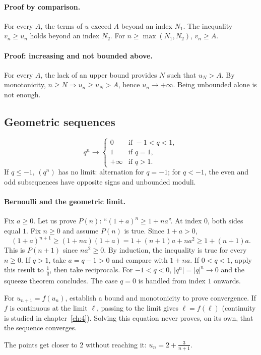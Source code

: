 \paragraph{Proof by comparison.} For every $A$, the terms of $u$ exceed $A$ beyond an index $N_1$. The inequality $v_n\ge u_n$ holds beyond an index $N_2$. For $n\ge\max(N_1,N_2)$, $v_n\ge A$.
\paragraph{Proof: increasing and not bounded above.} For every $A$, the lack of an upper bound provides $N$ such that $u_N>A$. By monotonicity, $n\ge N\Rightarrow u_n\ge u_N>A$, hence $u_n\to+\infty$. Being unbounded alone is not enough.
\subsection{Geometric sequences}
\[q^n\longrightarrow\begin{cases}0&\text{if }-1<q<1,\\1&\text{if }q=1,\\+\infty&\text{if }q>1.\end{cases}\]
If $q\le-1$, $(q^n)$ has no limit: alternation for $q=-1$; for $q<-1$, the even and odd subsequences have opposite signs and unbounded moduli.
\paragraph{Bernoulli and the geometric limit.} Fix $a\ge0$. Let us prove $P(n)$: ``$(1+a)^n\ge1+na$''. At index $0$, both sides equal $1$.
Fix $n\ge0$ and assume $P(n)$ is true. Since $1+a>0$,
\[(1+a)^{n+1}\ge(1+na)(1+a)=1+(n+1)a+na^2\ge1+(n+1)a.\]
This is $P(n+1)$ since $na^2\ge0$. By induction, the inequality is true for every $n\ge0$. If $q>1$, take $a=q-1>0$ and compare with $1+na$. If $0<q<1$, apply this result to $\frac{1}{q}$, then take reciprocals. For $-1<q<0$, $|q^n|=|q|^n\to0$ and the squeeze theorem concludes. The case $q=0$ is handled from index $1$ onwards.
\begin{method}
For $u_{n+1}=f(u_n)$, establish a bound and monotonicity to prove convergence. If $f$ is continuous at the limit $\ell$, passing to the limit gives $\ell=f(\ell)$ (continuity is studied in chapter~\ref{ch:4}). Solving this equation never proves, on its own, that the sequence converges.
\end{method}


\begin{center}\par\small The points get closer to $2$ without reaching it: $u_n=2+\frac{3}{n+1}$.\end{center}

